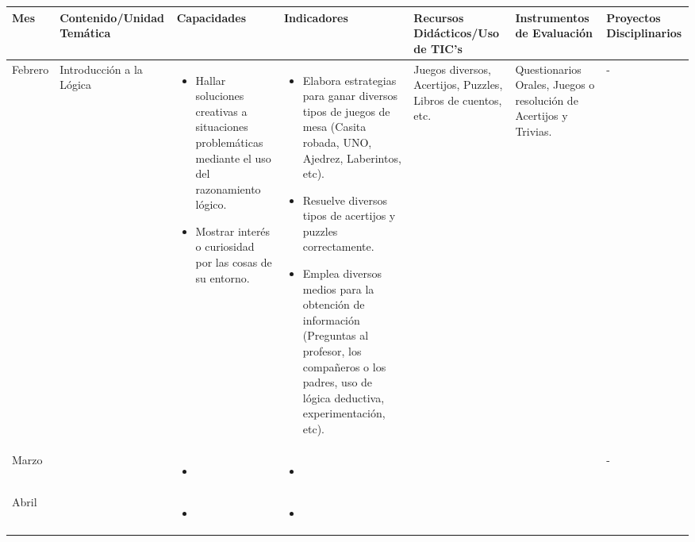 \documentclass[landscape, a4paper, 10pt]{article}
\newcommand{\smallcellwidth}{0.7in}
\newcommand{\normalcellwidth}{1.2in}
\newcommand{\bigcellwidth}{2.0in}
\begin{document}
	\begin{longtable}{|m{\smallcellwidth}|p{\normalcellwidth}|p{\bigcellwidth}|p{\bigcellwidth}|p{\normalcellwidth}|p{\normalcellwidth}|p{\normalcellwidth}|}
		\hline
		\textbf{Mes} &
		\textbf{Contenido/Unidad Temática} &
		\textbf{Capacidades} &
		\textbf{Indicadores} &
		\textbf{Recursos Didácticos/Uso de TIC's} &
		\textbf{Instrumentos de Evaluación} &
		\textbf{Proyectos Disciplinarios} \\
		\hline
		\endhead
		Febrero &
		Introducción a la Lógica &
		\begin{itemize}
			\item Hallar soluciones creativas a situaciones problemáticas mediante el uso del razonamiento lógico.
			\item Mostrar interés o curiosidad por las cosas de su entorno.
		\end{itemize} &
		\begin{itemize}
			\item Elabora estrategias para ganar diversos tipos de juegos de mesa (Casita robada, UNO, Ajedrez, Laberintos, etc).
			\item Resuelve diversos tipos de acertijos y puzzles correctamente.
			\item Emplea diversos medios para la obtención de información (Preguntas al profesor, los compañeros o los padres, uso de lógica deductiva, experimentación, etc).
 		\end{itemize} &
		Juegos diversos, Acertijos, Puzzles, Libros de cuentos, etc. &
		Questionarios Orales, Juegos o resolución de Acertijos y Trivias. &
		 - \\
		\hline
		Marzo &
		 &
		\begin{itemize}
			\item 
		\end{itemize} &
		\begin{itemize}
			\item 
		\end{itemize} &
		  &
		  &
		 - \\
		\hline
		Abril &
		 &
		\begin{itemize}
			\item 
		\end{itemize} &
		\begin{itemize}
			\item 
		\end{itemize} &

\end{longtable}
\end{document}
